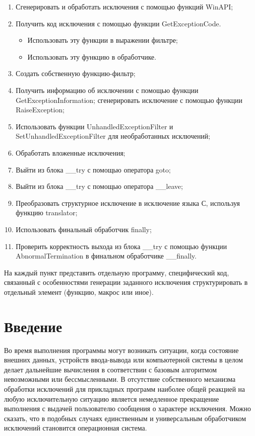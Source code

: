 \documentclass[a4paper, 12pt]{report}		%
\begin{document}
\begin{enumerate}
	\item Сгенерировать и обработать исключения с помощью функций WinAPI;
	\item Получить код исключения с помощью функции GetExceptionCode.
		\begin{itemize}
		\item Использовать эту функции в выражении фильтре;
		\item Использовать эту функцию в обработчике.
		\end{itemize}
	\item Создать собственную функцию-фильтр;
	\item Получить информацию об исключении с помощью функции GetExceptionInformation; сгенерировать исключение с помощью функции RaiseException;
	\item Использовать функции UnhandledExceptionFilter и SetUnhandledExceptionFilter для необработанных исключений;
	\item Обработать вложенные исключения;
	\item Выйти из блока \_\_try с помощью оператора goto;
	\item Выйти из блока \_\_try с помощью оператора \_\_leave;
	\item Преобразовать структурное исключение в исключение языка С, используя функцию translator;
	\item Использовать финальный обработчик finally;
	\item Проверить корректность выхода из блока \_\_try с помощью функции AbnormalTermination в финальном обработчике \_\_finally.
\end{enumerate}

На каждый пункт представить отдельную программу, специфический код, связанный с особенностями генерации заданного исключения структурировать в отдельный элемент (функцию, макрос или иное).


\chapter*{Введение}

Во время выполнения программы могут возникать ситуации, когда состояние внешних данных, устройств ввода-вывода или компьютерной системы в целом делает дальнейшие вычисления в соответствии с базовым алгоритмом невозможными или бессмысленными. В отсутствие собственного механизма обработки исключений для прикладных программ наиболее общей реакцией на любую исключительную ситуацию является немедленное прекращение выполнения с выдачей пользователю сообщения о характере исключения. Можно сказать, что в подобных случаях единственным и универсальным обработчиком исключений становится операционная система.
\end{document}
